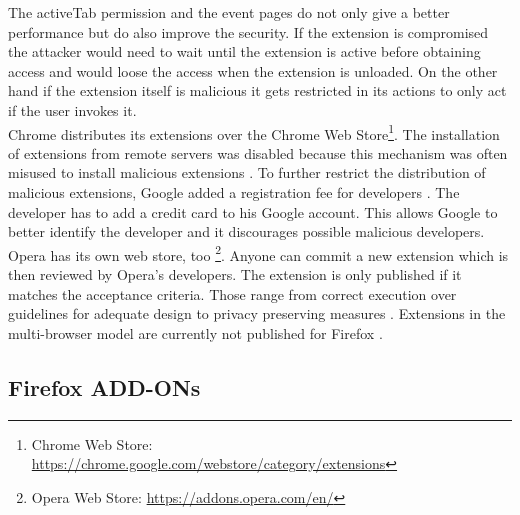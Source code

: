 \documentclass[article,colorback,accentcolor=tud9c,type=bsc]{tudthesis}
\let\stdsubsection\subsection
\renewcommand\subsection{\newpage\stdsubsection}
\begin{document}
	The activeTab permission and the event pages do not only give a better performance but do also improve the security. If the extension is compromised the attacker would need to wait until the extension is active before obtaining access and would loose the access when the extension is unloaded. On the other hand if the extension itself is malicious it gets restricted in its actions to only act if the user invokes it. \\
	
	Chrome distributes its extensions over the Chrome Web Store\footnote{Chrome Web Store: \url{https://chrome.google.com/webstore/category/extensions}}. The installation of extensions from remote servers was disabled because this mechanism was often misused to install malicious extensions \cite{chromeProtectFromMalicious}. To further restrict the distribution of malicious extensions, Google added a registration fee for developers \cite{chromeWebStoreFee}. The developer has to add a credit card to his Google account. This allows Google to better identify the developer and it discourages possible malicious developers. Opera has its own web store, too \footnote{Opera Web Store: \url{https://addons.opera.com/en/}}. Anyone can commit a new extension which is then reviewed by Opera's developers. The extension is only published if it matches the acceptance criteria. Those range from correct execution over guidelines for adequate design to privacy preserving measures \cite{operaSecurityReviewAcceptance}. Extensions in the multi-browser model are currently not published for Firefox \cite{mozillaWebExtensionStatus}.
	
\subsection{Firefox ADD-ONs}
\end{document}
